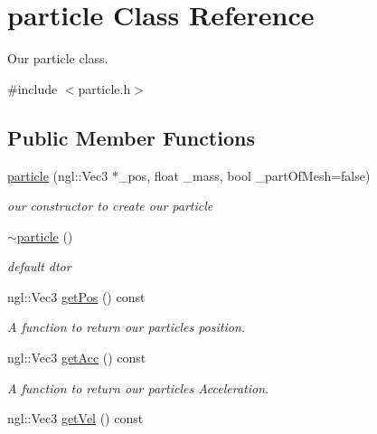 \hypertarget{classparticle}{\section{particle Class Reference}
\label{classparticle}
}


Our particle class.  




{\ttfamily \#include $<$particle.\-h$>$}

\subsection*{Public Member Functions}
\begin{DoxyCompactItemize}
\item 
\hyperlink{classparticle_a2849319f713e734cf009587505ba1075}{particle} (ngl\-::\-Vec3 $\ast$\-\_\-pos, float \-\_\-mass, bool \-\_\-part\-Of\-Mesh=false)
\begin{DoxyCompactList}\small\item\em our constructor to create our particle \end{DoxyCompactList}\item 
\hypertarget{classparticle_a6527e937e7db59e6edb6ae051c51866e}{\hyperlink{classparticle_a6527e937e7db59e6edb6ae051c51866e}{$\sim$particle} ()}\label{classparticle_a6527e937e7db59e6edb6ae051c51866e}

\begin{DoxyCompactList}\small\item\em default dtor \end{DoxyCompactList}\item 
\hypertarget{classparticle_ae6ee47584e0d79b3497ad2b906d764d5}{ngl\-::\-Vec3 \hyperlink{classparticle_ae6ee47584e0d79b3497ad2b906d764d5}{get\-Pos} () const }\label{classparticle_ae6ee47584e0d79b3497ad2b906d764d5}

\begin{DoxyCompactList}\small\item\em A function to return our particles position. \end{DoxyCompactList}\item 
\hypertarget{classparticle_abdcf2fa79e90f4b82c1d2eb5135e1322}{ngl\-::\-Vec3 \hyperlink{classparticle_abdcf2fa79e90f4b82c1d2eb5135e1322}{get\-Acc} () const }\label{classparticle_abdcf2fa79e90f4b82c1d2eb5135e1322}

\begin{DoxyCompactList}\small\item\em A function to return our particles Acceleration. \end{DoxyCompactList}\item 
\hypertarget{classparticle_a724a0799183e2a8f3665625187aaff30}{ngl\-::\-Vec3 \hyperlink{classparticle_a724a0799183e2a8f3665625187aaff30}{get\-Vel} () const }\label{classparticle_a724a0799183e2a8f3665625187aaff30}


\end{DoxyCompactItemize}
